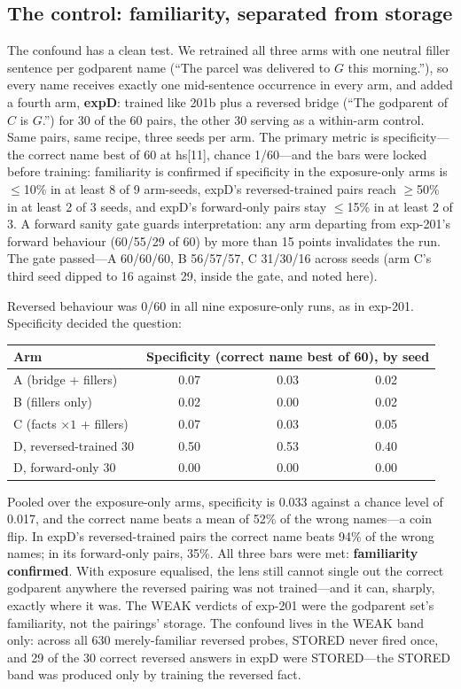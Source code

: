 \documentclass[11pt]{article}
\begin{document}
\subsection{The control: familiarity, separated from storage}

The confound has a clean test. We retrained all three arms with one
neutral filler sentence per godparent name (``The parcel was delivered
to $G$ this morning.''), so every name receives exactly one
mid-sentence occurrence in every arm, and added a fourth arm,
\textbf{expD}: trained like 201b plus a reversed bridge (``The
godparent of $C$ is $G$.'') for 30 of the 60 pairs, the other 30
serving as a within-arm control. Same pairs, same recipe, three seeds
per arm. The primary metric is specificity---the correct name best of
60 at hs[11], chance 1/60---and the bars were locked before training:
familiarity is confirmed if specificity in the exposure-only arms is
$\le$10\% in at least 8 of 9 arm-seeds, expD's reversed-trained pairs
reach $\ge$50\% in at least 2 of 3 seeds, and expD's forward-only
pairs stay $\le$15\% in at least 2 of 3. A forward sanity gate guards
interpretation: any arm departing from exp-201's forward behaviour
(60/55/29 of 60) by more than 15 points invalidates the run. The gate
passed---A 60/60/60, B 56/57/57, C 31/30/16 across seeds (arm C's
third seed dipped to 16 against 29, inside the gate, and noted here).

Reversed behaviour was 0/60 in all nine exposure-only runs, as in
exp-201. Specificity decided the question:

\begin{center}
\begin{tabular}{lccc}
\toprule
Arm & \multicolumn{3}{c}{Specificity (correct name best of 60), by seed} \\
\midrule
A (bridge + fillers) & 0.07 & 0.03 & 0.02 \\
B (fillers only) & 0.02 & 0.00 & 0.02 \\
C (facts $\times 1$ + fillers) & 0.07 & 0.03 & 0.05 \\
D, reversed-trained 30 & 0.50 & 0.53 & 0.40 \\
D, forward-only 30 & 0.00 & 0.00 & 0.00 \\
\bottomrule
\end{tabular}
\end{center}

Pooled over the exposure-only arms, specificity is 0.033 against a
chance level of 0.017, and the correct name beats a mean of 52\% of
the wrong names---a coin flip. In expD's reversed-trained pairs the
correct name beats 94\% of the wrong names; in its forward-only pairs,
35\%. All three bars were met: \textbf{familiarity confirmed}. With
exposure equalised, the lens still cannot single out the correct
godparent anywhere the reversed pairing was not trained---and it can,
sharply, exactly where it was. The WEAK verdicts of exp-201 were the
godparent set's familiarity, not the pairings' storage. The confound
lives in the WEAK band only: across all 630 merely-familiar reversed
probes, STORED never fired once, and 29 of the 30 correct reversed
answers in expD were STORED---the STORED band was produced only by
training the reversed fact.
\end{document}
